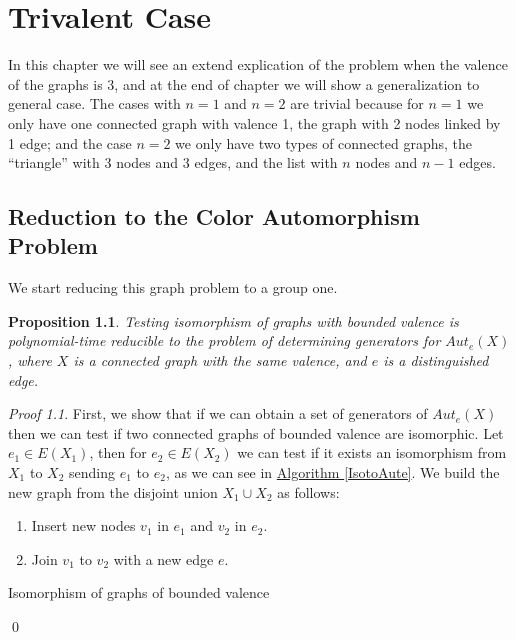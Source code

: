 \documentclass[12pt,a4paper]{book}
\theoremstyle{plain}
\newtheorem{proposition}{Proposition}
\theoremstyle{definition}
\theoremstyle{remark}
\newtheorem*{Proof}{Proof}
\begin{document}
\chapter{Trivalent Case}

In this chapter we will see an extend explication of the problem when the valence of the graphs is 3, and at the end of chapter 
we will show a generalization to general case. The cases with $n=1$ and $n=2$ are trivial because for $n=1$ we only have one connected 
graph with valence 1, the graph with 2 nodes linked by 1 edge; and the case $n=2$ we only have two types of connected graphs, the 
``triangle'' with 3 nodes and 3 edges, and the list with $n$ nodes and $n-1$ edges.

\section{Reduction to the Color Automorphism Problem}
 
 We start reducing this  graph problem to a group one.
 
\begin{proposition}
 Testing isomorphism of graphs with bounded valence is polynomial-time reducible to the problem of determining generators for $Aut_e(X)$, where 
$X$ is a connected graph with the same valence, and $e$ is a distinguished edge.
\end{proposition}

\begin{Proof}
 First, we show  that if we can obtain a set of generators of $Aut_e(X)$ then we can test if two connected graphs of bounded valence  are isomorphic.
Let $e_1  \in E( X_1)$, then for $e_2 \in E(X_2)$  we can test if it exists an isomorphism from $X_1$ to $X_2$ sending  $e_1$ to $e_2$, as we can see in 
\hyperlink{IsotoAute}{Algorithm \ref{IsotoAute}}. We build the new graph from the disjoint union $X_1 \cup X_2$ as follows:
\begin{enumerate}
 \item Insert new nodes $v_1$ in  $e_1$ and $v_2$ in $e_2$.
 \item Join $v_1$ to $v_2$ with a new edge $e$. 
\end{enumerate}



\begin{algorithm}\label{IsotoAute}\hypertarget{IsotoAute}{}
\caption{Isomorphism of graphs of bounded valence}

\end{algorithm}


\qed  \end{Proof}
\end{document}
